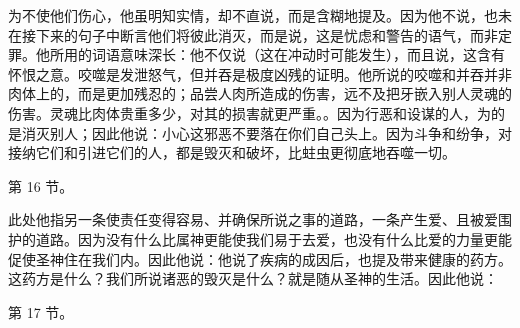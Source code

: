 为不使他们伤心，他虽明知实情，却不直说，而是含糊地提及。因为他不说，也未在接下来的句子中断言他们将彼此消灭，而是说，这是忧虑和警告的语气，而非定罪。他所用的词语意味深长：他不仅说（这在冲动时可能发生），而且说，这含有怀恨之意。咬噬是发泄怒气，但并吞是极度凶残的证明。他所说的咬噬和并吞并非肉体上的，而是更加残忍的；品尝人肉所造成的伤害，远不及把牙嵌入别人灵魂的伤害。灵魂比肉体贵重多少，对其的损害就更严重。。因为行恶和设谋的人，为的是消灭别人；因此他说：小心这邪恶不要落在你们自己头上。因为斗争和纷争，对接纳它们和引进它们的人，都是毁灭和破坏，比蛀虫更彻底地吞噬一切。\par

第 16 节。\newline{}\newline{}\par

此处他指另一条使责任变得容易、并确保所说之事的道路，一条产生爱、且被爱围护的道路。因为没有什么比属神更能使我们易于去爱，也没有什么比爱的力量更能促使圣神住在我们内。因此他说：他说了疾病的成因后，也提及带来健康的药方。这药方是什么？我们所说诸恶的毁灭是什么？就是随从圣神的生活。因此他说：\par

第 17 节。\newline{}\newline{}\par

